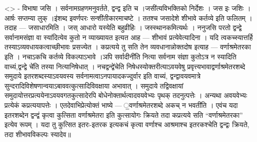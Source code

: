 \textless{}\textgreater{} - विभाषा जसि । सर्वनामग्रहणमनुवर्तते, द्वन्द्व
इति च ।जसी॑त्यविभक्तिको निर्देशः । जस इः जशिः । आर्षः सप्तम्या लुक्
।इ॑शब्द इवर्णपरः सन्शी॑तीकारमाचष्टे । ततश्च जसादेशे शीभावे कर्तव्ये इति
फलितम् । तदाह --- जसाधारमिति । जस् आधारो यस्येति बहुव्रीहिः ।
जस्स्थानकमित्यर्थः । ननुजसि परतो द्वन्द्वे सर्वानामसंज्ञा वा
स्या॑दित्येव कुतो न व्याख्यायत इत्यत आह --- शीभावं प्रत्येवेत्यादिना ।
यदि त्वकच्स्यात्तर्हि तस्याऽव्यवधायकत्वाच्छीभावः प्रसज्येत । कप्रत्यये
तु सति तेन व्यवधानान्नोक्तदोष इत्याह --- वर्णाश्रमेतरका इति । नचाऽकचि
कर्तव्ये विकल्पाऽभावे ।ञपि सर्वादीनी॑ति नित्या सर्वनाम संज्ञा कुतोऽत्र न
स्यादिति वाच्यं,द्वन्द्वे चे॑ति तस्या नित्यानिषेधात् । नचद्वन्द्वे॑चेति
निषेधस्योक्तरीत्याऽवयवेषु प्रवृत्त्यभावाद्वर्णाश्रमेतरशब्दे समुदाये
इतरशब्दस्याऽवयवस्य सर्वनामत्वाऽनपायादकज्दुर्वार इति वाच्यं,
द्वन्द्वावयवमात्रे सुन्दरादिविशेषणान्वयाऽबाववत्कुत्सादिविवक्षाया अभावात्
। समुदाये तद्विवक्षायां समुदायोत्तरप्रत्ययेनाऽवयवगतकुत्सादेरपि
बोधेनोक्तार्थत्वादवयवेभ्यः पृथक् तदनुत्पत्तेः । अन्यथा अवयवेभ्यः
प्रत्येकं कप्रत्ययापत्तेः । एतदेवाभिप्रेत्योक्तं भाष्ये ---
॒वर्णाश्रमेतरशब्दे अकच् न भवती॑ति । एवंच यदा इतरशब्देन द्वन्द्वं कृत्वा
कुत्सिता वर्णाश्रमेतरा इति कुत्सायोगः क्रियते तदा कप्रत्यये सति
``वर्णाश्रमेतरका'' इत्येव रूपम् । यदा तु कुत्सित इतरः-इतरक इत्यकचं
कृत्वा वर्णाश्च आश्रमाश्च इतरकश्चेति द्वन्द्वः क्रियते, तदा शीभावविकल्पः
स्यादेव॥

